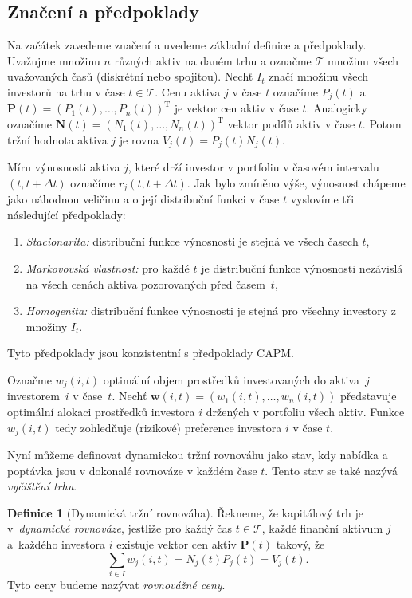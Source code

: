 \documentclass[a4paper,12pt]{report}
\theoremstyle{definition} \newtheorem{definice}[veta]{Definice}
\theoremstyle{remark}
\begin{document}
\subsection{Značení a předpoklady}
Na začátek zavedeme značení a  uvedeme základní definice a předpoklady. 
Uvažujme množinu $n$ různých aktiv na daném trhu a označme $\mathcal{T}$ množinu všech uvažovaných časů (diskrétní nebo spojitou).
Nechť $I_t$ značí množinu všech investorů na trhu v čase $t\in \mathcal{T}$.
Cenu aktiva $j$ v čase $t$ označíme $P_j(t)$ a~$\boldsymbol{P}(t)=(P_1(t),\dots,P_n(t))^\mathrm{T}$ je vektor cen aktiv v čase $t$.
Analogicky označíme $\boldsymbol{N}(t)=(N_1(t),\dots,N_n(t))^\mathrm{T}$ vektor podílů aktiv v čase $t$.
Potom tržní hodnota aktiva $j$ je rovna $V_j(t)=P_j(t)N_j(t)$.

Míru výnosnosti aktiva $j$, které drží investor v portfoliu v časovém intervalu $(t,t+\Delta t)$ označíme $r_j(t,t+\Delta t)$.
Jak bylo zmíněno výše, výnosnost chápeme jako náhodnou veličinu a o její distribuční funkci v čase $t$ vyslovíme tři následující předpoklady:
\begin{enumerate}
\item \label{Stacionarita} \textit{Stacionarita:} distribuční funkce výnosnosti  je stejná ve všech časech $t$,                                                                            
\item \label{Martingalvl} \textit{Markovovská vlastnost:} pro každé $t$ je distribuční funkce výnosnosti nezávislá na všech cenách aktiva pozorovaných před časem~$t$,
\item \label{Homogenita} \textit{Homogenita:} distribuční funkce výnosnosti je stejná pro všechny investory z množiny $I_t$. 
\end{enumerate} 
Tyto předpoklady jsou konzistentní s předpoklady CAPM.

Označme $w_{j}(i,t)$ optimální objem prostředků investovaných do aktiva~$j$ investorem~$i$ v čase~$t$.
Nechť $\boldsymbol{w}(i,t)=(w_{1}(i,t),\dots,w_{n}(i,t))$ představuje optimální alokaci prostředků investora $i$ držených v portfoliu všech aktiv.
Funkce $w_{j}(i,t)$ tedy zohledňuje (rizikové) preference investora $i$ v čase $t$.
  
Nyní můžeme definovat dynamickou tržní rovnováhu jako stav, kdy  nabídka a poptávka jsou v dokonalé rovnováze v každém čase $t$.
Tento stav se také nazývá \textit{vyčištění trhu}.
         
\begin{definice}[Dynamická tržní rovnováha]
Řekneme, že kapitálový trh je v~\textit{dynamické rovnováze}, jestliže pro každý čas $t\in \mathcal{T}$, každé finanční aktivum $j$ a~každého investora $i$ existuje vektor cen aktiv $\boldsymbol{P}(t)$ takový, že
$$\sum_{i\in I} w_{j}(i,t)=N_j(t)P_j(t)=V_j(t).$$
Tyto ceny budeme nazývat \textit{rovnovážné ceny}.
\end{definice}
\end{document}
